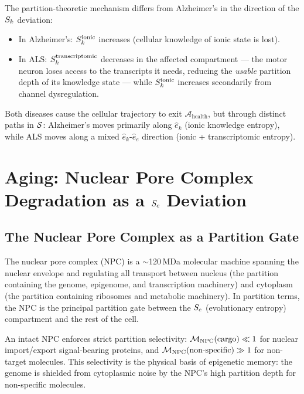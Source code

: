 The partition-theoretic mechanism differs from Alzheimer's in the direction
of the $S_k$ deviation:
\begin{itemize}
  \item In Alzheimer's: $S_k^{\mathrm{ionic}}$ increases (cellular knowledge
        of ionic state is lost).
  \item In ALS: $S_k^{\mathrm{transcriptomic}}$ decreases in the affected
        compartment --- the motor neuron loses access to the transcripts it
        needs, reducing the \emph{usable} partition depth of its
        knowledge state --- while $S_k^{\mathrm{ionic}}$ increases
        secondarily from channel dysregulation.
\end{itemize}
Both diseases cause the cellular trajectory to exit $\mathcal{A}_{\mathrm{health}}$,
but through distinct paths in $\mathcal{S}$: Alzheimer's moves primarily along
$\hat{e}_k$ (ionic knowledge entropy), while ALS moves along a mixed
$\hat{e}_k$-$\hat{e}_e$ direction (ionic + transcriptomic entropy).

\section{Aging: Nuclear Pore Complex Degradation as a \texorpdfstring{$S_e$}{Se} Deviation}
\label{sec:aging_npc}

\subsection{The Nuclear Pore Complex as a Partition Gate}
\label{ssec:npc_partition}

The nuclear pore complex (NPC) is a $\sim$120\,MDa molecular machine
spanning the nuclear envelope and regulating all transport between nucleus
(the partition containing the genome, epigenome, and transcription machinery)
and cytoplasm (the partition containing ribosomes and metabolic machinery).
In partition terms, the NPC is the principal partition gate between the
$S_e$ (evolutionary entropy) compartment and the rest of the cell.

An intact NPC enforces strict partition selectivity:
$\mathcal{M}_{\mathrm{NPC}}(\text{cargo}) \ll 1$ for nuclear import/export
signal-bearing proteins, and $\mathcal{M}_{\mathrm{NPC}}(\text{non-specific}) \gg 1$
for non-target molecules. This selectivity is the physical basis of
epigenetic memory: the genome is shielded from cytoplasmic noise by
the NPC's high partition depth for non-specific molecules.


